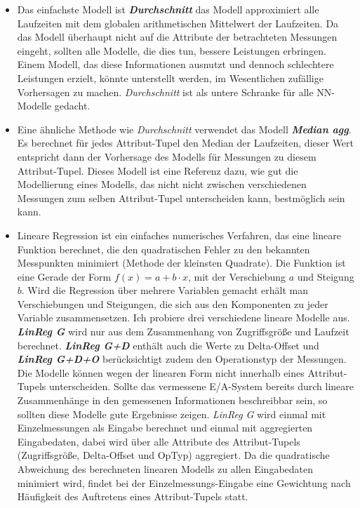 \documentclass[
	12pt,
	a4paper,
	BCOR10mm,
	DIV14,
	listof=totoc,
	bibliography=totoc,
	headsepline
]{scrreprt}
\begin{document}
\begin{itemize}
	\item Das einfachste Modell ist \textit{\textbf{Durchschnitt}} das Modell approximiert alle Laufzeiten mit dem globalen arithmetischen Mittelwert der Laufzeiten.
Da das Modell überhaupt nicht auf die Attribute der betrachteten Messungen eingeht, sollten alle Modelle, die dies tun, bessere Leistungen erbringen. Einem Modell, das diese Informationen ausnutzt und dennoch schlechtere Leistungen erzielt, könnte unterstellt werden, im Wesentlichen zufällige Vorhersagen zu machen.
\textit{Durchschnitt} ist als untere Schranke für alle NN-Modelle gedacht.
	\item Eine ähnliche Methode wie \textit{Durchschnitt} verwendet das Modell \textit{\textbf{Median agg}}. Es berechnet für jedes Attribut-Tupel den Median der Laufzeiten, dieser Wert entspricht dann der Vorhersage des Modells für Messungen zu diesem Attribut-Tupel.
Dieses Modell ist eine Referenz dazu, wie gut die Modellierung eines Modells, das nicht nicht zwischen verschiedenen Messungen zum selben Attribut-Tupel unterscheiden kann, bestmöglich sein kann.
	\item Lineare Regression ist ein einfaches numerisches Verfahren, das eine lineare Funktion berechnet, die den quadratischen Fehler zu den bekannten Messpunkten minimiert (Methode der kleinsten Quadrate).
Die Funktion ist eine Gerade der Form $f(x) = a + b \cdot x$, mit der Verschiebung $a$ und Steigung $b$. Wird die Regression über mehrere Variablen gemacht erhält man Verschiebungen und Steigungen, die sich aus den Komponenten zu jeder Variable zusammensetzen.
Ich probiere drei verschiedene lineare Modelle aus.
\textit{\textbf{LinReg G}} wird nur aus dem Zusammenhang von Zugriffsgröße und Laufzeit berechnet.
\textit{\textbf{LinReg G+D}} enthält auch die Werte zu Delta-Offset und \textit{\textbf{LinReg G+D+O}} berücksichtigt zudem den Operationstyp der Messungen.
Die Modelle können wegen der linearen Form nicht innerhalb eines Attribut-Tupels unterscheiden. Sollte das vermessene E/A-System bereits durch lineare Zusammenhänge in den gemessenen Informationen beschreibbar sein, so sollten diese Modelle gute Ergebnisse zeigen.
\textit{LinReg G} wird einmal mit Einzelmessungen als Eingabe berechnet und einmal mit aggregierten Eingabedaten, dabei wird über alle Attribute des Attribut-Tupels (Zugriffsgröße, Delta-Offset und OpTyp) aggregiert. 
Da die quadratische Abweichung des berechneten linearen Modells zu allen Eingabedaten minimiert wird, findet bei der Einzelmessungs-Eingabe eine Gewichtung nach Häufigkeit des Auftretens eines Attribut-Tupels statt.

\end{itemize}
\end{document}
